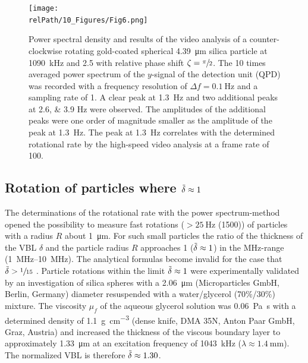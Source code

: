 \begin{figure}
    \centering
    \texttt{[image: \\relPath/10\_Figures/Fig6.png]}
    \caption{Power spectral density and results of the video analysis of a 
      counter-clockwise rotating gold-coated spherical \SI{4.39}{\micro\meter} 
      silica particle at \SI{1090}{\kilo\hertz} and \SI{2.5}{\Vrms} with 
      relative phase shift $\zeta= \sfrac{\pi}{2}$. The 10 times averaged power 
      spectrum of the $y$-signal of the detection unit (QPD) was recorded with a 
      frequency resolution of $\Delta f=\SI{0.1}{\hertz}$ and a sampling rate of 
      \SI{1}{\MS}. A clear peak at \SI{1.3}{\hertz} and two additional peaks at 
      \numlist{2.6; 3.9} \si{\hertz} were observed. The amplitudes of the 
      additional peaks were one order of magnitude smaller as the amplitude of 
      the peak at \SI{1.3}{\hertz}. The peak at \SI{1.3}{\hertz} correlates with 
  the determined rotational rate by the high-speed video analysis at a frame 
  rate of \SI{100}{\fps}.\label{fig:VT-Fig6}}
\end{figure}%

\subsection{Rotation of particles where $\tilde{\delta} \approx 
1$\label{sec:VT-rotationParticles}}

The determinations of the rotational rate with the power spectrum-method opened 
the possibility to measure fast rotations ($>\SI{25}{\hertz}$ (\SI{1500}{\rpm})) 
of particles with a radius $R$ about \SI{1}{\micro\meter}.  For such small 
particles the ratio of the thickness of the VBL $\delta$ and 
the particle radius $R$ approaches 1 ($\tilde{\delta} \approx 1$) in the 
\si{\mega\hertz}-range (\SIrange{1}{10}{\mega\hertz}). The analytical formulas 
become invalid for the case that $\tilde{\delta} > \sfrac{1}{15}$ \cite{Hahn2016}.  
Particle rotations within the limit $\tilde{\delta} \approx 1$ were experimentally 
validated by an investigation of silica spheres with a \SI{2.06}{\micro\meter} 
(Microparticles GmbH, Berlin, Germany) diameter resuspended with a 
water/glycerol (70$\%$/30$\%$) mixture.  The viscosity $\mu_f$ of the aqueous 
glycerol solution was \SI{0.06}{\pascal\second} \cite{Jerome1968} with a 
determined density of \SI{1.1}{\gram\per\centi\meter\cubed} (dense knife, DMA 
35N, Anton Paar GmbH, Graz, Austria) and increased the thickness of the viscous 
boundary layer to approximately \SI{1.33}{\micro\meter} at an excitation 
frequency of \SI{1043}{\kilo\hertz} ($\lambda \approx \SI{1.4}{\mm}$). The 
normalized VBL is therefore $\tilde{\delta} \approx 1.30$.

